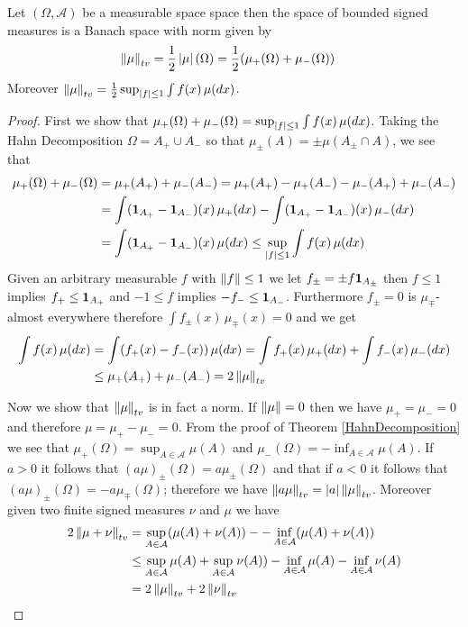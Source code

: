 \begin{thm}\label{BanachSpaceBoundedSignedMeasures}Let $(\Omega, \mathcal{A})$ be a measurable space space then the space
  of bounded signed measures is a Banach space with norm given by
\begin{align*}
\left \lVert  \mu \right \rVert_{tv} &= \frac{1}{2} \left \vert \mu \right \vert(\Omega) = \frac{1}{2} (\mu_+(\Omega) + \mu_-(\Omega))
\end{align*}  
Moreover $\left \lVert  \mu \right \rVert_{tv} = \frac{1}{2} \sup_{\left \vert f \right \vert \leq 1} \int f (x) \, \mu(dx)$.
\end{thm}
\begin{proof}
First we show that $\mu_+(\Omega) + \mu_-(\Omega) = \sup_{\left \vert f \right \vert \leq 1} \int f (x) \, \mu(dx)$.  Taking the Hahn Decomposition $\Omega = A_+ \cup A_-$ so that
$\mu_\pm(A) = \pm \mu(A_\pm \cap A)$, we see that 
\begin{align*}
\mu_+(\Omega) + \mu_-(\Omega) &= \mu_+(A_+) + \mu_-(A_-) = \mu_+(A_+) - \mu_+(A_-) - \mu_-(A_+) + \mu_-(A_-) \\
&= \int (\textbf{1}_{A_+} - \textbf{1}_{A_-}) (x) \, \mu_+(dx) - \int (\textbf{1}_{A_+} - \textbf{1}_{A_-} )(x) \, \mu_-(dx) \\
&= \int (\textbf{1}_{A_+} - \textbf{1}_{A_-}) (x) \, \mu(dx) \leq \sup_{\left \vert f \right \vert \leq 1} \int f (x) \, \mu(dx)
\end{align*}
Given an arbitrary measurable $f$ with $\left \lVert f \right \rVert \leq 1$ we let $f_\pm = \pm f \textbf{1}_{A_\pm}$ then $f \leq 1$ implies $f_+ \leq \textbf{1}_{A_+}$ and
$-1 \leq f$ implies $-f_- \leq \textbf{1}_{A_-}$.  Furthermore $f_\pm=0$ is $\mu_\mp$-almost everywhere therefore $\int f_\pm(x) \, \mu_\mp(x) = 0$ and we
get
\begin{align*}
\int f(x) \, \mu(dx) &= \int (f_+(x) - f_-(x)) \, \mu(dx) = \int f_+(x) \, \mu_+(dx) + \int f_-(x) \, \mu_-(dx) \\
&\leq \mu_+(A_+) + \mu_-(A_-) = 2 \left \lVert  \mu \right \rVert_{tv}
\end{align*}

Now we show that $\left \lVert  \mu \right \rVert_{tv}$ is in fact a norm.  If $\left \lVert \mu \right \rVert = 0$ then we have $\mu_+ = \mu_- = 0$ and therefore
$\mu = \mu_+ - \mu_- = 0$.  From the proof of
Theorem \ref{HahnDecomposition} we see that $\mu_+(\Omega) = \sup_{A \in
  \mathcal{A}} \mu(A)$ and $\mu_-(\Omega) = -\inf_{A \in
  \mathcal{A}} \mu(A)$.  If $a > 0$ it follows that
$(a \mu)_\pm(\Omega) = a \mu_{\pm}(\Omega)$ and that if $a < 0$ it follows that $(a
\mu)_\pm(\Omega) = -a \mu_{\mp}(\Omega)$; therefore we have $\left \lVert  a\mu \right \rVert_{tv} =
\left \vert a \right \vert \left \lVert  \mu \right \rVert_{tv}$.
Moreover given two finite signed measures $\nu$ and $\mu$ we have
\begin{align*}
2 \left \lVert  \mu + \nu \right \rVert_{tv} &= \sup_{A \in \mathcal{A}} (\mu(A) + \nu(A)) -
                   -\inf_{A \in \mathcal{A}} (\mu(A) + \nu(A)) \\
&\leq \sup_{A \in \mathcal{A}}\mu(A) + \sup_{A \in \mathcal{A}} \nu(A)) -\inf_{A \in \mathcal{A}} \mu(A) -\inf_{A \in \mathcal{A}} \nu(A) \\
&= 2 \left \lVert  \mu \right \rVert_{tv} + 2 \left \lVert  \nu \right \rVert_{tv}
\end{align*}


\end{proof}
